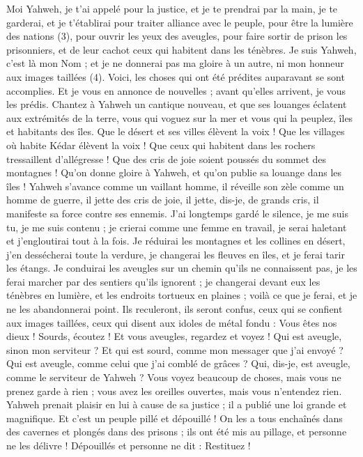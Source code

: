 \begin{multicols}{2}
Moi Yahweh, je t'ai appelé pour la justice, et je te prendrai par la main, je te garderai, et je t’établirai pour traiter alliance avec le peuple, pour être la lumière des nations (3),
pour ouvrir les yeux des aveugles, pour faire sortir de prison les prisonniers, et de leur cachot ceux qui habitent dans les ténèbres.
Je suis Yahweh, c'est là mon Nom ; et je ne donnerai pas ma gloire à un autre, ni mon honneur aux images taillées (4).
Voici, les choses qui ont été prédites auparavant se sont accomplies. Et je vous en annonce de nouvelles ; avant qu’elles arrivent, je vous les prédis.
Chantez à Yahweh un cantique nouveau, et que ses louanges éclatent aux extrémités de la terre, vous qui voguez sur la mer et vous qui la peuplez, îles et habitants des îles.
Que le désert et ses villes élèvent la voix ! Que les villages où habite Kédar élèvent la voix ! Que ceux qui habitent dans les rochers tressaillent d’allégresse ! Que des cris de joie soient poussés du sommet des montagnes !
Qu'on donne gloire à Yahweh, et qu'on publie sa louange dans les îles !
Yahweh s’avance comme un vaillant homme, il réveille son zèle comme un homme de guerre, il jette des cris de joie, il jette, dis-je, de grands cris, il manifeste sa force contre ses ennemis.
J’ai longtemps gardé le silence, je me suis tu, je me suis contenu ; je crierai comme une femme en travail, je serai haletant et j'engloutirai tout à la fois.
Je réduirai les montagnes et les collines en désert, j’en dessécherai toute la verdure, je changerai les fleuves en îles, et je ferai tarir les étangs.
Je conduirai les aveugles sur un chemin qu’ils ne connaissent pas, je les ferai marcher par des sentiers qu'ils ignorent ; je changerai devant eux les ténèbres en lumière, et les endroits tortueux en plaines ; voilà ce que je ferai, et je ne les abandonnerai point.
Ils reculeront, ils seront confus, ceux qui se confient aux images taillées, ceux qui disent aux idoles de métal fondu : Vous êtes nos dieux !
Sourds, écoutez ! Et vous aveugles, regardez et voyez !
Qui est aveugle, sinon mon serviteur ? Et qui est sourd, comme mon messager que j'ai envoyé ? Qui est aveugle, comme celui que j'ai comblé de grâces ? Qui, dis-je, est aveugle, comme le serviteur de Yahweh ?
Vous voyez beaucoup de choses, mais vous ne prenez garde à rien ; vous avez les oreilles ouvertes, mais vous n'entendez rien.
Yahweh prenait plaisir en lui à cause de sa justice ; il a publié une loi grande et magnifique.
Et c’est un peuple pillé et dépouillé ! On les a tous enchaînés dans des cavernes et plongés dans des prisons ; ils ont été mis au pillage, et personne ne les délivre ! Dépouillés et personne ne dit : Restituez !

\end{multicols}
